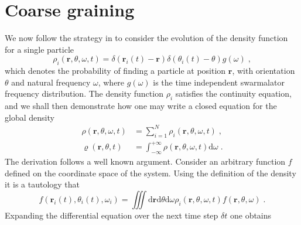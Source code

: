 \documentclass{article}
\begin{document}
\section{Coarse graining}
We now follow the strategy in \cite{DavidSDean_1996} to consider the evolution of the density function for a single particle
\begin{equation}
    \rho _i\left( \mathbf{r},\theta ,\omega ,t \right) =\delta \left( \mathbf{r}_i\left( t \right) -\mathbf{r} \right) \delta \left( \theta _i\left( t \right) -\theta \right) g \left( \omega \right)\;, 
\end{equation}
which denotes the probability of finding a particle at position $\mathbf{r}$, with orientation $\theta$ and natural frequency $\omega$, where $g\left( \omega \right)$ is the time independent swarmalator frequency distribution. The density function $\rho _i$ satisfies the continuity equation, and we shall then demonstrate how one may write a closed equation for the global density
\begin{subequations}
    \begin{align}
        \rho \left( \mathbf{r},\theta ,\omega ,t \right) &=\sum_{i=1}^N{\rho _i\left( \mathbf{r},\theta ,\omega ,t \right)}\;,\\
        \varrho \left( \mathbf{r},\theta ,t \right) &=\int_{-\infty}^{+\infty}{\rho \left( \mathbf{r},\theta ,\omega ,t \right) \mathrm{d}\omega}\;.
        \label{eq:coarseDensitySub2}
    \end{align}
\end{subequations}
The derivation follows a well known argument. Consider an arbitrary function $f$ defined on the coordinate space of the system. Using the definition of the density it is a tautology
that
\begin{equation}
    \label{eq:arbitraryFunction}
    f\left( \mathbf{r}_i\left( t \right) ,\theta _i\left( t \right) ,\omega _i \right) =\iiint{\text{d}\mathbf{r}\text{d}\theta \text{d}\omega \rho _i\left( \mathbf{r},\theta ,\omega ,t \right) f\left( \mathbf{r},\theta ,\omega \right)}\;.
\end{equation}
Expanding the differential equation over the next time step $\delta t$ one obtains
\end{document}
